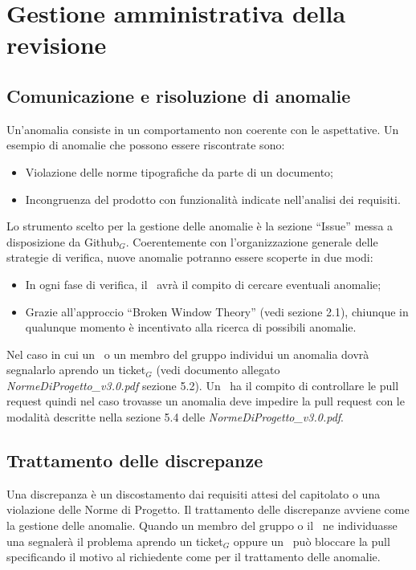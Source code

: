 \section{Gestione amministrativa della revisione}
\subsection{Comunicazione e risoluzione di anomalie}
Un'anomalia consiste in un comportamento non coerente con le aspettative. Un esempio di anomalie che possono essere riscontrate sono:
\begin{itemize}
	\item Violazione delle norme tipografiche da parte di un documento;
	\item Incongruenza del prodotto con funzionalità indicate nell'analisi dei requisiti.
\end{itemize}
Lo strumento scelto per la gestione delle anomalie è la sezione ``Issue'' messa a disposizione da Github$_G$. Coerentemente con l'organizzazione generale delle strategie di verifica, nuove anomalie potranno essere scoperte in due modi:

\begin{itemize}
	\item In ogni fase di verifica, il \ruoloVerificatore\ avrà il compito di cercare eventuali anomalie;
	\item Grazie all'approccio ``Broken Window Theory'' (vedi sezione 2.1), chiunque in qualunque momento è incentivato alla ricerca di possibili anomalie.
\end{itemize}
Nel caso in cui un \ruoloVerificatore\ o un membro del gruppo individui un anomalia dovrà segnalarlo aprendo un ticket$_G$ (vedi documento allegato \textit{NormeDiProgetto\_v3.0.pdf} sezione 5.2). Un \ruoloVerificatore\ ha il compito di controllare le pull request quindi nel caso trovasse un anomalia deve impedire la pull request con le modalità descritte nella sezione 5.4 delle \textit{NormeDiProgetto\_v3.0.pdf}.

\subsection{Trattamento delle discrepanze}
Una discrepanza è un discostamento dai requisiti attesi del capitolato o una violazione delle Norme di Progetto. Il trattamento delle discrepanze avviene come la gestione delle anomalie. Quando un membro del gruppo o il \ruoloVerificatore\ ne individuasse una segnalerà il problema aprendo un ticket$_G$ oppure un \ruoloVerificatore\ può bloccare la pull specificando il motivo al richiedente come per il trattamento delle anomalie.
\newpage\right 
